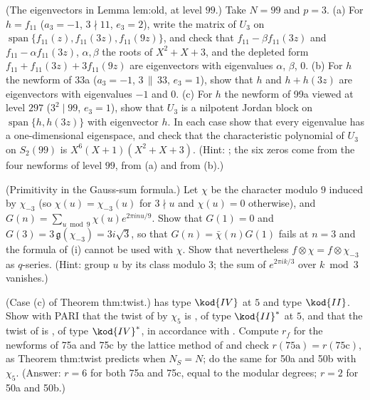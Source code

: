 \begin{exercise}\label{ex:hecke:ex-lemold}
(The eigenvectors in Lemma lem:old, at level $99$.) Take $N=99$ and $p=3$. (a) For $h=f_{11}$ ($a_3=-1$, $3\nmid11$, $e_3=2$), write the matrix of $U_3$ on $\operatorname{span}\{f_{11}(z),f_{11}(3z),f_{11}(9z)\}$,
and check that $f_{11}-\beta f_{11}(3z)$ and $f_{11}-\alpha f_{11}(3z)$, $\alpha,\beta$ the roots of $X^2+X+3$, and the depleted form $f_{11}+f_{11}(3z)+3f_{11}(9z)$ are eigenvectors with eigenvalues $\alpha$, $\beta$, $0$. (b) For $h$ the
newform of 33a ($a_3=-1$, $3\,\|\,33$, $e_3=1$), show that $h$ and $h+h(3z)$ are eigenvectors with eigenvalues $-1$ and $0$. (c) For $h$ the newform of 99a viewed at level $297$ ($3^2\mid99$, $e_3=1$),
show that $U_3$ is a nilpotent Jordan block on $\operatorname{span}\{h,h(3z)\}$ with eigenvector $h$. In each case show that every eigenvalue has a one-dimensional eigenspace, and check that
the characteristic polynomial of $U_3$ on $S_2(99)$ is $X^6(X+1)(X^2+X+3)$. (Hint: ; the six zeros come from the four newforms of level $99$, from (a) and from (b).)
\end{exercise}

\begin{exercise}\label{ex:hecke:ex-gauss}
(Primitivity in the Gauss-sum formula.) Let $\chi$ be the character modulo $9$ induced by $\chi_{-3}$ (so $\chi(u)=\chi_{-3}(u)$ for $3\nmid u$ and $\chi(u)=0$ otherwise), and
$G(n)=\sum_{u\bmod9}\chi(u)e^{2\pi inu/9}$. Show that $G(1)=0$ and $G(3)=3\,\mathfrak g(\chi_{-3})=3i\sqrt3$, so that $G(n)=\bar\chi(n)G(1)$ fails at $n=3$ and the formula of
(i) cannot be used with $\chi$. Show that nevertheless $f\otimes\chi=f\otimes\chi_{-3}$ as $q$-series. (Hint: group $u$ by its class modulo $3$; the sum of
$e^{2\pi ik/3}$ over $k\bmod3$ vanishes.)
\end{exercise}

\begin{exercise}\label{ex:hecke:ex-case-c}
(Case (c) of Theorem thm:twist.)  has type $\kod{IV}$ at $5$ and  type $\kod{II}$. Show with PARI that the twist of  by $\chi_5$ is , of type
$\kod{II}^*$ at $5$, and that the twist of  is , of type $\kod{IV}^*$, in accordance with . Compute $r_f$ for the newforms of 75a and 75c by the lattice
method of  and check $r(\text{75a})=r(\text{75c})$, as Theorem thm:twist predicts when $N_S=N$; do the same for 50a and 50b with $\chi_5$. (Answer: $r=6$ for
both 75a and 75c, equal to the modular degrees; $r=2$ for 50a and 50b.)
\end{exercise}

